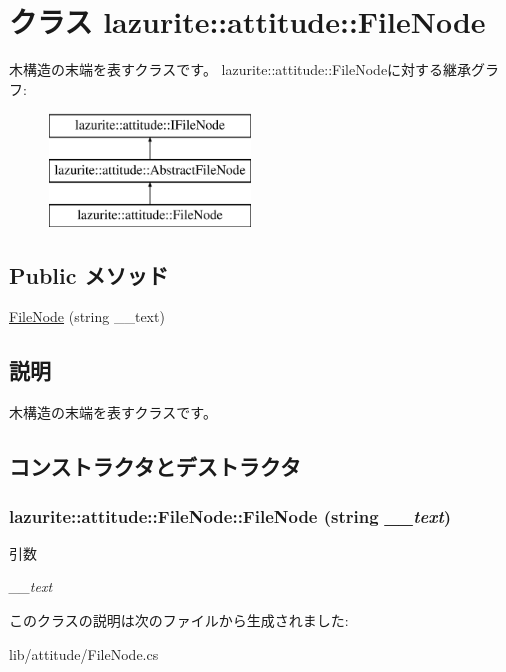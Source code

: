 \hypertarget{classlazurite_1_1attitude_1_1_file_node}{
\section{クラス lazurite::attitude::FileNode}
\label{classlazurite_1_1attitude_1_1_file_node}
}


木構造の末端を表すクラスです。  
lazurite::attitude::FileNodeに対する継承グラフ:\begin{figure}[H]
\begin{center}
\leavevmode
\includegraphics[height=3cm]{classlazurite_1_1attitude_1_1_file_node}
\end{center}
\end{figure}
\subsection*{Public メソッド}
\begin{DoxyCompactItemize}
\item 
\hyperlink{classlazurite_1_1attitude_1_1_file_node_a4cbbc70223eddedd0456239cc6433ee7}{FileNode} (string \_\-\_\-text)
\end{DoxyCompactItemize}


\subsection{説明}
木構造の末端を表すクラスです。 

\subsection{コンストラクタとデストラクタ}
\hypertarget{classlazurite_1_1attitude_1_1_file_node_a4cbbc70223eddedd0456239cc6433ee7}{
\subsubsection[{FileNode}]{\setlength{\rightskip}{0pt plus 5cm}lazurite::attitude::FileNode::FileNode (string {\em \_\-\_\-text})}}
\label{classlazurite_1_1attitude_1_1_file_node_a4cbbc70223eddedd0456239cc6433ee7}

\begin{DoxyParams}{引数}
\item[{\em \_\-\_\-text}]\end{DoxyParams}


このクラスの説明は次のファイルから生成されました:\begin{DoxyCompactItemize}
\item 
lib/attitude/FileNode.cs\end{DoxyCompactItemize}
